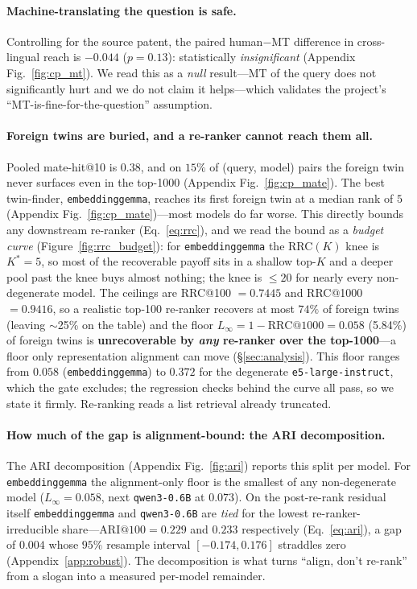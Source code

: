 \documentclass[11pt]{article}
\begin{document}
\paragraph{Machine-translating the question is safe.}
Controlling for the source patent, the paired human$-$MT difference in
cross-lingual reach is $-0.044$ ($p=0.13$): statistically
\emph{insignificant} (Appendix Fig.~\ref{fig:cp_mt}). We read this as a \emph{null}
result---MT of the query does not significantly hurt and we do not claim it
helps---which validates the project's ``MT-is-fine-for-the-question''
assumption.

\paragraph{Foreign twins are buried, and a re-ranker cannot reach them all.}
Pooled mate-hit@10 is $0.38$, and on $15\%$ of (query, model) pairs the foreign
twin never surfaces even in the top-1000 (Appendix Fig.~\ref{fig:cp_mate}). The best
twin-finder, \texttt{embeddinggemma}, reaches its first foreign twin at a median
rank of $5$ (Appendix Fig.~\ref{fig:cp_mate})---most models do far worse. This directly
bounds any downstream re-ranker (Eq.~\ref{eq:rrc}), and we read the bound as a
\emph{budget curve} (Figure~\ref{fig:rrc_budget}): for \texttt{embeddinggemma}
the RRC$(K)$ knee is $K^{\!*}{=}5$, so most of the recoverable payoff sits in a
shallow top-$K$ and a deeper pool past the knee buys almost nothing; the knee is
$\le 20$ for nearly every non-degenerate model. The ceilings are RRC@100 $=0.7445$
and RRC@1000 $=0.9416$, so a realistic top-100 re-ranker recovers at most $74\%$
of foreign twins (leaving $\sim$25\% on the table) and the floor
$L_\infty = 1-\mathrm{RRC@1000} = \mathbf{0.058}$ (5.84\%) of foreign twins is
\textbf{unrecoverable by \emph{any} re-ranker over the top-1000}---a floor only
representation alignment can move (\S\ref{sec:analysis}). This floor ranges from
$0.058$ (\texttt{embeddinggemma}) to $0.372$ for the degenerate
\texttt{e5-large-instruct}, which the gate excludes; the regression checks behind
the curve all pass, so we state it firmly. Re-ranking reads a list retrieval
already truncated.

\paragraph{How much of the gap is alignment-bound: the ARI decomposition.}
The ARI decomposition (Appendix Fig.~\ref{fig:ari}) reports this split per model. For
\texttt{embeddinggemma} the alignment-only floor is the smallest of any
non-degenerate model ($L_\infty=0.058$, next \texttt{qwen3-0.6B} at $0.073$).
On the post-re-rank residual itself \texttt{embeddinggemma} and \texttt{qwen3-0.6B}
are \emph{tied} for the lowest re-ranker-irreducible share---$\mathrm{ARI@}100 =
0.229$ and $0.233$ respectively (Eq.~\ref{eq:ari}), a gap of $0.004$ whose
$95\%$ resample interval $[-0.174, 0.176]$ straddles zero (Appendix~\ref{app:robust}).
The decomposition is what turns ``align, don't re-rank'' from a slogan into a
measured per-model remainder.
\end{document}
